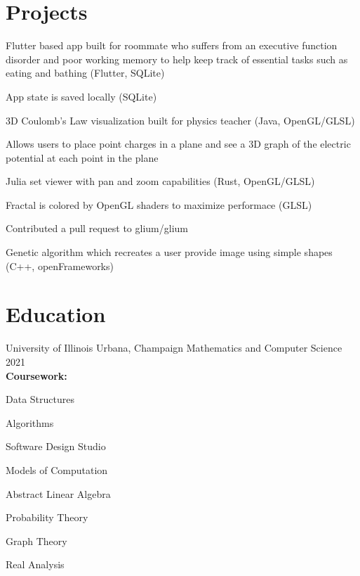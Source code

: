 \documentclass[hidelinks,11pt]{extarticle}
\begin{document}
\section{Projects}

{
    \item Flutter based app built for roommate who suffers from an executive 
        function disorder and poor working memory to help keep track of essential 
        tasks such as eating and bathing (Flutter, SQLite)
    \item App state is saved locally (SQLite)
}
%
{
    \item 3D Coulomb's Law visualization built for physics teacher (Java, OpenGL/GLSL)
    \item Allows users to place point charges in a plane and see a 3D graph of the electric potential at each point in the plane}

{
    \item Julia set viewer with pan and zoom capabilities (Rust, OpenGL/GLSL)
    \item Fractal is colored by OpenGL shaders to maximize performace (GLSL)
    \item Contributed a pull request to glium/glium
}

{
    \item Genetic algorithm which recreates a user provide image using simple 
        shapes (C++, openFrameworks)
}



\section{Education}
\school
{University of Illinois}
{Urbana, Champaign}
{Mathematics and Computer Science}
{2021}
\\
\textbf{Coursework:} 
\begin{citemize*}
    \item[] Data Structures 
    \item Algorithms 
    \item Software Design Studio 
    \item Models of Computation 
    \item Abstract Linear Algebra 
    \item Probability Theory 
    \item Graph Theory 
    \item Real Analysis 
\end{citemize*}
\end{document}
